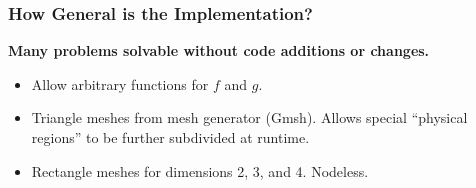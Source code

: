 \documentclass[compress]{beamer}
\begin{document}
\begin{frame}
  \frametitle{How General is the Implementation?}
  \textbf{Many problems solvable without code additions or changes.}

  \pause
  \vspace{0.15cm}
  \begin{itemize}[<+->]
    \item Allow arbitrary functions for $f$ and $g$.
    \item Triangle meshes from mesh generator (Gmsh). Allows special ``physical regions'' to be further subdivided at runtime.
    \item Rectangle meshes for dimensions 2, 3, and 4.  Nodeless.
  \end{itemize}

  \begin{columns}
  \end{columns}
\end{frame}
\end{document}
